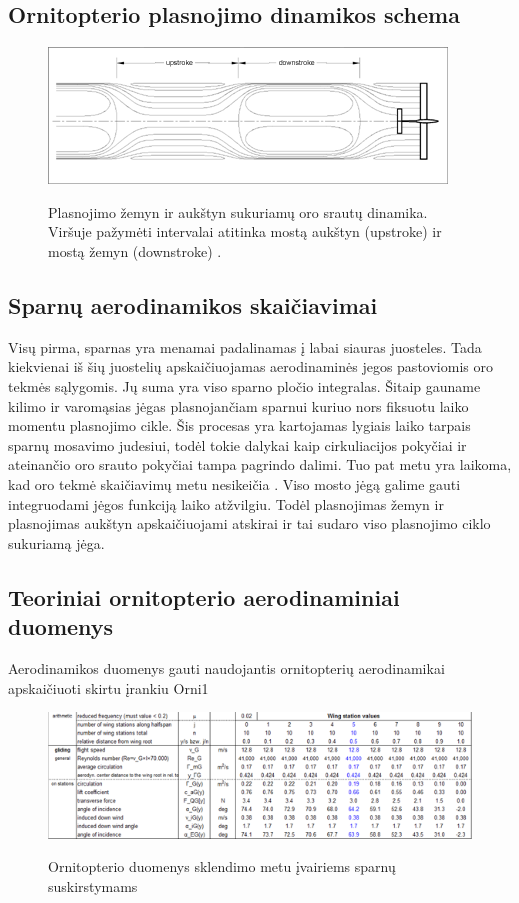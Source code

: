 \documentclass{VUMIFPSkursinis}
\begin{document}
\subsection{Ornitopterio plasnojimo dinamikos schema}

\begin{figure}[h]
\caption{Plasnojimo žemyn ir aukštyn sukuriamų oro srautų dinamika. Viršuje pažymėti intervalai atitinka mostą aukštyn (upstroke) ir mostą žemyn (downstroke) .}
\centering
\includegraphics{img/vortex}\cite{7}\\
\end{figure}

\subsection{Sparnų aerodinamikos skaičiavimai}
Visų pirma, sparnas yra menamai padalinamas į labai siauras juosteles. Tada kiekvienai iš šių juostelių apskaičiuojamas aerodinaminės jegos pastoviomis oro tekmės sąlygomis. Jų suma yra viso sparno pločio integralas.
Šitaip gauname kilimo ir varomąsias jėgas plasnojančiam sparnui kuriuo nors fiksuotu laiko momentu plasnojimo cikle.
Šis procesas yra kartojamas lygiais laiko tarpais sparnų mosavimo judesiui, todėl tokie dalykai kaip cirkuliacijos pokyčiai ir ateinančio oro srauto pokyčiai tampa pagrindo dalimi. Tuo pat metu yra laikoma, kad oro tekmė skaičiavimų metu nesikeičia .
Viso mosto jėgą galime gauti integruodami jėgos funkciją laiko atžvilgiu. Todėl plasnojimas žemyn ir plasnojimas aukštyn apskaičiuojami atskirai ir tai sudaro viso plasnojimo ciklo sukuriamą jėga. \cite{3}

\subsection{Teoriniai ornitopterio aerodinaminiai duomenys}
Aerodinamikos duomenys gauti naudojantis ornitopterių aerodinamikai apskaičiuoti skirtu įrankiu Orni1 \cite{4}\\
\begin{figure}[h]
\caption{Ornitopterio duomenys sklendimo metu įvairiems sparnų suskirstymams}
\centering
\includegraphics[scale=0.9]{img/gliding}\\
\end{figure}
\end{document}
